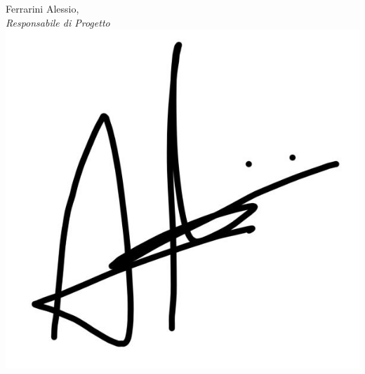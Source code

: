 \documentclass[a4paper, 12pt]{letter}
\begin{document}
\begin{letter}
\begin{flushright}
        	\closing{Ferrarini Alessio, \\ \textit{Responsabile di Progetto} \\ \includegraphics[scale=0.25]{../../assets/FirmaAlessio.jpg}} 
        \end{flushright}
    \end{letter}
\end{document}
